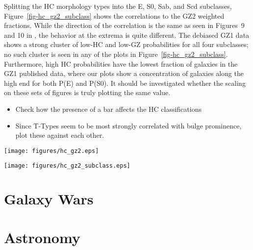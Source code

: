 \documentclass[useAMS,usenatbib]{mn2e}
\begin{document}
Splitting the HC morphology types into the E, S0, Sab, and Scd subclasses, Figure~\ref{fig-hc_gz2_subclass} shows the correlations to the GZ2 weighted fractions. While the direction of the correlation is the same as seen in Figures~9 and 10 in \citet{hue11}, the behavior at the extrema is quite different. The debiased GZ1 data shows a strong cluster of low-HC and low-GZ probabilities for all four subclasses; no such cluster is seen in any of the plots in Figure~\ref{fig-hc_gz2_subclass}. Furthermore, high HC probabilities have the lowest fraction of galaxies in the GZ1 published data, where our plots show a concentration of galaxies along the high end for both P(E) and P(S0). It should be investigated whether the scaling on these sets of figures is truly plotting the same value. 

\begin{itemize}
	\item Check how the presence of a bar affects the HC classifications
	\item Since T-Types seem to be most strongly correlated with bulge prominence, plot these against each other. 
\end{itemize}

\begin{figure*}
\texttt{[image: figures/hc\_gz2.eps]}
\caption{Left: GZ2 smooth weighted fraction as a function of \citet{hue11} early-type probability. Right: GZ2 features/disk weighted fraction as a function of HC late-type probability. Whiter values in both indicate a larger fraction of galaxies in that bin (logarithmic scale).
\label{fig-hc_gz2}}
\end{figure*}

\begin{figure*}
\texttt{[image: figures/hc\_gz2\_subclass.eps]}
\caption{Left: GZ2 smooth weighted fraction as a function of \citet{hue11} early-type probability. Right: GZ2 features/disk weighted fraction as a function of HC late-type probability. Whiter values in both indicate a larger fraction of galaxies in that bin (logarithmic scale).
\label{fig-hc_gz2_subclass}}
\end{figure*}



\section{Galaxy Wars}\label{sec_galaxywars}
\section{Astronomy}\label{sec_astronomy}
\end{document}
